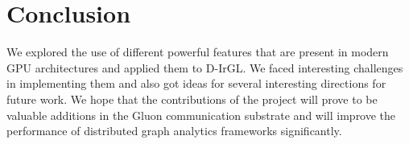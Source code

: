 \section{Conclusion}
We explored the use of different powerful features that are present in modern GPU architectures and applied them to D-IrGL. We faced interesting challenges in implementing them and also got ideas for several interesting directions for future work. We hope that the contributions of the project will prove to be valuable additions in the Gluon communication substrate and will improve the performance of distributed graph analytics frameworks significantly. 